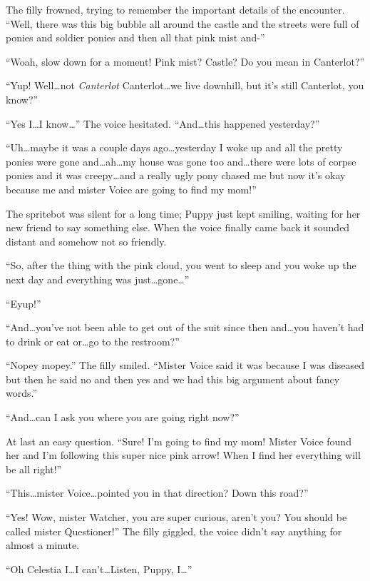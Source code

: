 The filly frowned, trying to remember the important details of the encounter. ``Well, there was this big bubble all around the castle and the streets were full of ponies and soldier ponies and then all that pink mist and-''

``Woah, slow down for a moment! Pink mist? Castle? Do you mean in Canterlot?''

``Yup! Well\dots not \emph{Canterlot} Canterlot\dots we live downhill, but it's still Canterlot, you know?''

``Yes I\dots I know\dots'' The voice hesitated. ``And\dots this happened yesterday?''

``Uh\dots maybe it was a couple days ago\dots yesterday I woke up and all the pretty ponies were gone and\dots ah\dots my house was gone too and\dots there were lots of corpse ponies and it was creepy\dots and a really ugly pony chased me but now it's okay because me and mister Voice are going to find my mom!''

The spritebot was silent for a long time; Puppy just kept smiling, waiting for her new friend to say something else. When the voice finally came back it sounded distant and somehow not so friendly.

``So, after the thing with the pink cloud, you went to sleep and you woke up the next day and everything was just\dots gone\dots''

``Eyup!''

``And\dots you've not been able to get out of the suit since then and\dots you haven't had to drink or eat or\dots go to the restroom?''

``Nopey mopey.'' The filly smiled. ``Mister Voice said it was because I was diseased but then he said no and then yes and we had this big argument about fancy words.''

``And\dots can I ask you where you are going right now?''

At last an easy question. ``Sure! I'm going to find my mom! Mister Voice found her and I'm following this super nice pink arrow! When I find her everything will be all right!''

``This\dots mister Voice\dots pointed you in that direction? Down this road?''

``Yes! Wow, mister Watcher, you are super curious, aren't you? You should be called mister Questioner!'' The filly giggled, the voice didn't say anything for almost a minute.

``Oh Celestia I\dots I can't\dots Listen, Puppy, I\dots''

